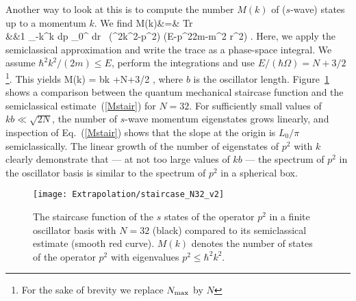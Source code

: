	Another way to look at this is to compute the number $M(k)$ of ($s$-wave)
	states up to a momentum $k$.  We find
	\bea
	  M(k)&=& {\rm Tr} 
	  \nonumber\\
	  &\approx&{1\pi\hbar} \int\limits_{-\hbar k}^{\hbar k}\! dp
	  \int\limits_0^\infty\! dr \,
	   \Theta\left(\hbar^2k^2-p^2\right)
	   \Theta\left(E-{p^2\over 2m}-{m}\Omega^2 r^2\right)
	   \; .
	\eea
	Here, we apply the semiclassical approximation and write the trace
	as a phase-space integral.  We assume $\hbar^2k^2/(2m)\le
	E$, perform the integrations and use $E/(\hbar\Omega)= N+3/2$
	\footnote{For the sake of brevity we replace ${N_{\mathrm{max}}}$ by $N$}. This
	yields
	\bea
	  M(k) = {bk\pi}
	   +{N+3/2\over \pi}
	  \;,
	  \label{Mstair}
	\eea
	where $b$ is the oscillator length.
	Figure~\ref{fig:staircase} shows a comparison between the quantum
	mechanical staircase function and the semiclassical
	estimate~(\ref{Mstair}) for $N=32$.  For sufficiently small values of
	$kb\ll\sqrt{2N}$, the number of $s$-wave momentum eigenstates grows
	linearly, and inspection of Eq.~(\ref{Mstair}) shows that the slope at
	the origin is $L_0/\pi$ semiclassically.  The linear growth of the
	number of eigenstates of $p^2$ with $k$ clearly demonstrate that --- at
	not too large values of $kb$ --- the spectrum of $p^2$ in the oscillator
	basis is similar to the spectrum of $p^2$ in a spherical
	box.
	\begin{figure}[h]
	\centering
	\texttt{[image: Extrapolation/staircase\_N32\_v2]}
	\caption{The staircase function of the $s$ states of
	  the operator $p^2$ in a finite oscillator basis with $N=32$ (black)
	  compared to its semiclassical estimate (smooth red curve). $M(k)$
	  denotes the number of states of the operator $p^2$ with eigenvalues
	  $p^2\le\hbar^2 k^2$.}
	\label{fig:staircase}
	\end{figure}

